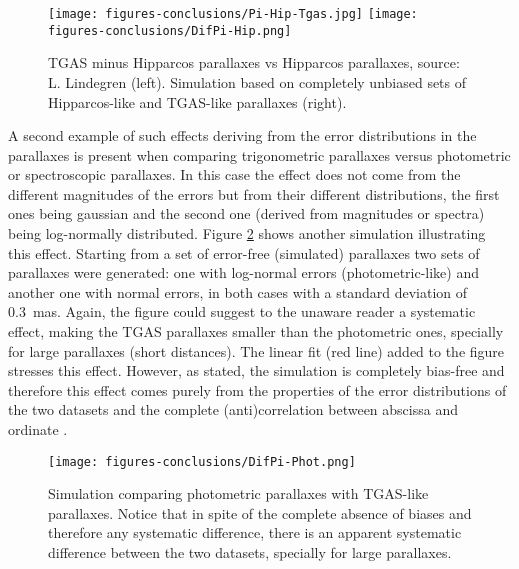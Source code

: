  \begin{figure}
 \centering
   \texttt{[image: figures-conclusions/Pi-Hip-Tgas.jpg]}
   \texttt{[image: figures-conclusions/DifPi-Hip.png]}
   \caption{TGAS minus Hipparcos parallaxes vs Hipparcos parallaxes, source: L. Lindegren (left).
   Simulation based on completely unbiased sets of Hipparcos-like and TGAS-like 
   parallaxes (right). \label{fig:pi-Hip-Tgas}}
 \end{figure}


A second example of such effects deriving from the error distributions in the 
parallaxes is present when comparing trigonometric parallaxes versus photometric
or spectroscopic parallaxes. In this case the effect does not come from the
different magnitudes of the errors but from their different distributions, the first
ones being gaussian and the second one (derived from magnitudes or spectra)
being log-normally distributed. Figure \ref{fig:DifPi-Phot} shows another simulation
illustrating this effect. Starting from a set of error-free (simulated) parallaxes 
two sets of parallaxes were generated: one with log-normal errors (photometric-like) 
and another one with normal errors, in both cases with a standard deviation of 0.3~mas. 
Again, the figure could suggest to the unaware reader a systematic effect, making
the TGAS parallaxes smaller than the photometric ones, specially for large parallaxes
(short distances). The linear fit (red line)
added to the figure stresses this effect. However, as stated, the simulation is
completely bias-free and therefore this effect comes purely from the properties
of the error distributions of the two datasets
and the complete (anti)correlation between abscissa and ordinate
\citep[see also][Fig. 4]{1999ASPC..167...13A}.

 \begin{figure}
 \centering
   \texttt{[image: figures-conclusions/DifPi-Phot.png]}
   \caption{Simulation comparing photometric parallaxes with TGAS-like parallaxes. Notice that
            in spite of the complete absence of biases and therefore any
            systematic difference, there is an apparent systematic difference
            between the two datasets, specially for large parallaxes. \label{fig:DifPi-Phot}}
 \end{figure}


